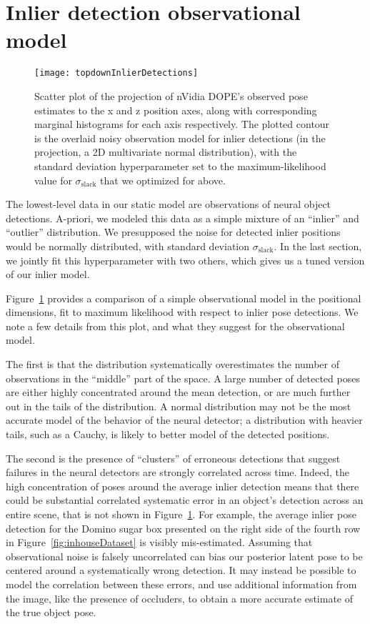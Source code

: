 \section{Inlier detection observational model}
\begin{figure}[H]
  \texttt{[image: topdownInlierDetections]}
  \caption{
    Scatter plot of the projection of nVidia DOPE's observed pose estimates to the x and z position axes, along with corresponding marginal histograms for each axis respectively.
    The plotted contour is the overlaid noisy observation model for inlier detections (in the projection, a 2D multivariate normal distribution), with the standard deviation hyperparameter set to the maximum-likelihood value for $\sigma_\mathrm{slack}$ that we optimized for above.
  }
  \label{fig:topdownInlierDetections}
\end{figure}
The lowest-level data in our static model are observations of neural object detections.
A-priori, we modeled this data as a simple mixture of an ``inlier'' and ``outlier'' distribution.
We presupposed the noise for detected inlier positions would be normally distributed, with standard deviation $\sigma_\mathrm{slack}$.
In the last section, we jointly fit this hyperparameter with two others, which gives us a tuned version of our inlier model.

Figure~\ref{fig:topdownInlierDetections} provides a comparison of a simple observational model in the positional dimensions, fit to maximum likelihood with respect to inlier pose detections.
We note a few details from this plot, and what they suggest for the observational model.

The first is that the distribution systematically overestimates the number of observations in the ``middle'' part of the space.
A large number of detected poses are either highly concentrated around the mean detection, or are much further out in the tails of the distribution.
A normal distribution may not be the most accurate model of the behavior of the neural detector; a distribution with heavier tails, such as a Cauchy, is likely to better model of the detected positions.

The second is the presence of ``clusters'' of erroneous detections that suggest failures in the neural detectors are strongly correlated across time.
Indeed, the high concentration of poses around the average inlier detection means that there could be substantial correlated systematic error in an object's detection across an entire scene, that is not shown in Figure~\ref{fig:topdownInlierDetections}.
For example, the average inlier pose detection for the Domino sugar box presented on the right side of the fourth row in Figure~\ref{fig:inhouseDataset} is visibly mis-estimated.
Assuming that observational noise is falsely uncorrelated can bias our posterior latent pose to be centered around a systematically wrong detection.
It may instead be possible to model the correlation between these errors, and use additional information from the image, like the presence of occluders, to obtain a more accurate estimate of the true object pose.

